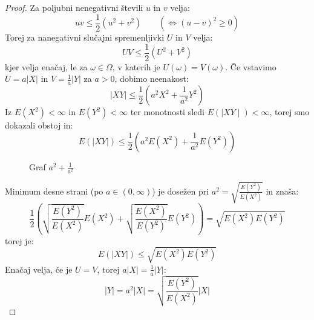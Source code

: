 \documentclass[12pt]{book}
\def\n{\noindent}
\theoremstyle{definition}
\theoremstyle{plain}
\theoremstyle{plain}
\theoremstyle{plain}
\theoremstyle{remark}
\begin{document}
\begin{proof}
    Za poljubni nenegativni števili $u$ in $v$ velja: 
    $$
    u v \leq \frac{1}{2}\left(u^2+v^2\right) \qquad \left(\iff (u-v)^2 \geq 0 \right)
    $$
    Torej za nanegativni slučajni spremenljivki $U$ in $V$ velja:
    $$
    U V \leq \frac{1}{2}\left(U^2+V^2\right)
    $$
    kjer velja enačaj, le za $\omega \in \Omega$, v katerih je $U(\omega) = V(\omega)$. Če vstavimo $U=a|X|$ in $V=\frac{1}{a} |Y|$ za $a>0$, dobimo neenakost: 
    $$
    |X Y| \leq \frac{1}{2}\left(a^2 X^2+\frac{1}{a^2} Y^2\right)
    $$
    Iz $E\left(X^2\right)<\infty$ in $E\left(Y^2\right)<\infty$ ter monotnosti sledi $E(\mid X Y \mid)<\infty$, torej smo dokazali obstoj in:
    $$
    E(|XY|) \leq \frac{1}{2}\left(a^2 E\left(X^2\right)+\frac{1}{a^2} E\left(Y^2\right)\right)
    $$  

    \begin{figure}[H]
        \centering

        \caption{Graf $a^2 + \frac{1}{a^2}$}
        \label{fig:8}
    \end{figure}

    \n Minimum desne strani (po $a \in (0, \infty)$) je dosežen pri $a^2=\sqrt{\frac{E\left(Y^2\right)}{E\left(X^2\right)}}$ in znaša: 
    $$
    \frac{1}{2}\left(\sqrt{\frac{E\left(Y^2\right)}{E\left(X^2\right)}}  E\left(X^2\right)+\sqrt{\frac{E\left(X^2\right)}{E\left(Y^2\right)}}  E\left(Y^2\right)\right) = \sqrt{E\left(X^2\right) E\left(Y^2\right)}
    $$
    torej je: 
    $$
    E(|X Y|) \leq \sqrt{E\left(X^2\right) E\left(Y^2\right)}
    $$
    Enačaj velja, če je $U = V$, torej  $a |X|= \frac{1}{a}|Y|$:
    $$
    |Y|=a^2 |X|=\sqrt{\frac{E\left(Y^2\right)}{E\left(X^2\right)}} |X|
    $$
\end{proof}
\end{document}
